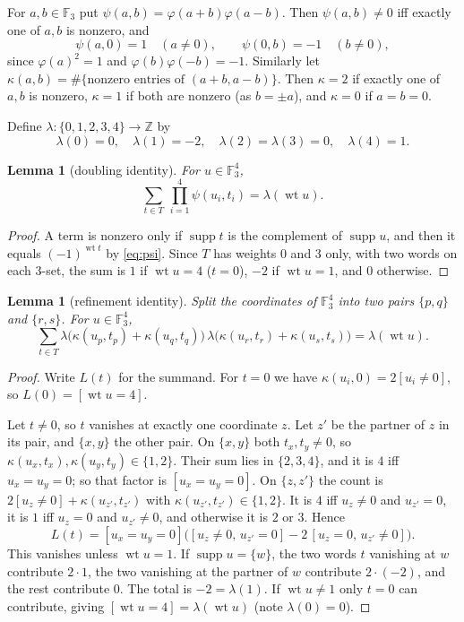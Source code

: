 \documentclass[11pt]{amsart}
\newtheorem{lemma}[theorem]{Lemma}
\theoremstyle{definition}
\newcommand{\F}{\mathbb{F}_3}
\newcommand{\wt}{\operatorname{wt}}
\newcommand{\supp}{\operatorname{supp}}
\begin{document}
For $a,b\in\F$ put $\psi(a,b)=\varphi(a+b)\varphi(a-b)$. Then $\psi(a,b)\neq0$ iff exactly one
of $a,b$ is nonzero, and
\begin{equation}\label{eq:psi}
  \psi(a,0)=1\quad(a\ne0),\qquad \psi(0,b)=-1\quad(b\neq0),
\end{equation}
since $\varphi(a)^2=1$ and $\varphi(b)\varphi(-b)=-1$. Similarly let
$\kappa(a,b)=\#\{\text{nonzero entries of }(a+b,a-b)\}$. Then $\kappa=2$ if exactly one of $a,b$
is nonzero, $\kappa=1$ if both are nonzero (as $b=\pm a$), and $\kappa=0$ if $a=b=0$.

Define $\lambda\colon\{0,1,2,3,4\}\to\mathbb Z$ by
\[
  \lambda(0)=0,\quad\lambda(1)=-2,\quad\lambda(2)=\lambda(3)=0,\quad\lambda(4)=1 .
\]

\begin{lemma}[doubling identity]\label{lem:A}
For $u\in\F^4$,
\[
  \sum_{t\in T}\ \prod_{i=1}^4\psi(u_i,t_i)=\lambda(\wt u).
\]
\end{lemma}

\begin{proof}
A term is nonzero only if $\supp t$ is the complement of $\supp u$, and then it equals
$(-1)^{\wt t}$ by \eqref{eq:psi}. Since $T$ has weights $0$ and $3$ only, with two words on each
$3$-set, the sum is $1$ if $\wt u=4$ ($t=0$), $-2$ if $\wt u=1$, and $0$ otherwise.
\end{proof}

\begin{lemma}[refinement identity]\label{lem:B}
Split the coordinates of $\F^4$ into two pairs $\{p,q\}$ and $\{r,s\}$. For $u\in\F^4$,
\[
  \sum_{t\in T}\lambda\bigl(\kappa(u_p,t_p)+\kappa(u_q,t_q)\bigr)\,
               \lambda\bigl(\kappa(u_r,t_r)+\kappa(u_s,t_s)\bigr)=\lambda(\wt u).
\]
\end{lemma}

\begin{proof}
Write $L(t)$ for the summand. For $t=0$ we have $\kappa(u_i,0)=2[u_i\ne0]$, so
$L(0)=[\wt u=4]$.

Let $t\neq0$, so $t$ vanishes at exactly one coordinate $z$. Let $z'$ be the partner of $z$ in its pair,
and $\{x,y\}$ the other pair. On $\{x,y\}$ both $t_x,t_y\neq0$, so
$\kappa(u_x,t_x),\kappa(u_y,t_y)\in\{1,2\}$. Their sum lies in $\{2,3,4\}$, and it is $4$ iff
$u_x=u_y=0$; so that factor is $[u_x=u_y=0]$. On $\{z,z'\}$ the count is
$2[u_z\ne0]+\kappa(u_{z'},t_{z'})$ with $\kappa(u_{z'},t_{z'})\in\{1,2\}$. It is $4$ iff
$u_z\neq0$ and $u_{z'}=0$, it is $1$ iff $u_z=0$ and $u_{z'}\ne0$, and otherwise it is $2$ or $3$. Hence
\[
  L(t)=[u_x=u_y=0]\bigl([u_z\ne0,\,u_{z'}=0]-2\,[u_z=0,\,u_{z'}\neq0]\bigr).
\]
This vanishes unless $\wt u=1$. If $\supp u=\{w\}$, the two words $t$ vanishing at $w$ contribute
$2\cdot 1$, the two vanishing at the partner of $w$ contribute $2\cdot(-2)$, and the rest
contribute $0$. The total is $-2=\lambda(1)$. If $\wt u\ne1$ only $t=0$ can contribute, giving
$[\wt u=4]=\lambda(\wt u)$ (note $\lambda(0)=0$).
\end{proof}
\end{document}
